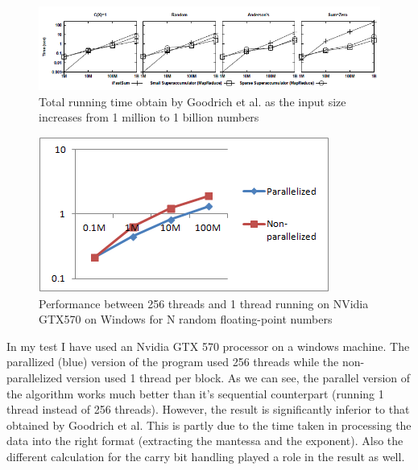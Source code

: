 \documentclass[11pt]{article}       %
\begin{document}
\begin{figure}[h]
\centering
\includegraphics[width=\linewidth]{goodrich_performance}
{\footnotesize \par}
\caption{Total running time obtain by Goodrich et al. \cite{PASFPN} as the input size increases from 1 million to 1 billion numbers}
\end{figure}

\begin{figure}[h]
\centering
\begin{minipage}{0.60\textwidth} %
\includegraphics[width=\linewidth]{performance}
{\footnotesize \par}
\end{minipage}
\caption{Performance between 256 threads and 1 thread running on NVidia GTX570 on Windows for N random floating-point numbers}
\end{figure}

In my test I have used an Nvidia GTX 570 processor on a windows machine. The parallized (blue) version of the program used 256 threads while the non-parallelized version used 1 thread per block. As we can see, the parallel version of the algorithm works much better than it's sequential counterpart (running 1 thread instead of 256 threads). However, the result is significantly inferior to that obtained by Goodrich et al. This is partly due to the time taken in processing the data into the right format (extracting the mantessa and the exponent). Also the different calculation for the carry bit handling played a role in the result as well.
\end{document}
